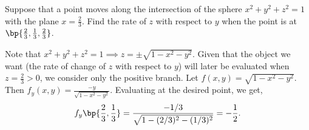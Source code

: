 \begin{problem}
    Suppose that a point moves along the intersection of the sphere $x^2 + y^2 + z^2 = 1$ with the plane $x = \frac23$. Find the rate of $z$ with respect to $y$ when the point is at $\bp{\frac23, \frac13, \frac23}$.
\end{problem}
\begin{solution}
    Note that $x^2 + y^2 + z^2 = 1 \implies z = \pm \sqrt{1 - x^2 - y^2}$. Given that the object we want (the rate of change of $z$ with respect to $y$) will later be evaluated when $z = \frac23 > 0$, we consider only the positive branch. Let $f(x, y) = \sqrt{1 - x^2 - y^2}$. Then $f_y(x, y) = \frac{-y}{\sqrt{1 - x^2 - y^2}}$. Evaluating at the desired point, we get, \[f_y\bp{\frac23, \frac13} = \frac{-1/3}{\sqrt{1 - (2/3)^2 - (1/3)^2}} = -\frac12.\]
\end{solution}

